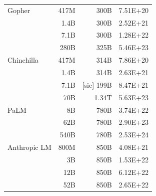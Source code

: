\begin{table}[!ht]
\begin{tabular}{lrrr}
         \midrule
         Gopher & 417M & 300B & 7.51E+20 \\
         & 1.4B & 300B & 2.52E+21 \\
         & 7.1B & 300B & 1.28E+22 \\
         & 280B	& 325B & 5.46E+23 \\
         \midrule
         Chinchilla & 417M & 314B & 7.86E+20 \\
         & 1.4B & 314B & 2.63E+21 \\
         & 7.1B & [sic] 199B & 8.47E+21 \\
         & 70B	& 1.34T & 5.63E+23 \\
         \midrule
        PaLM & 8B & 780B & 3.74E+22 \\
         & 62B & 780B & 2.90E+23 \\
         & 540B & 780B & 2.53E+24 \\
         \midrule
        Anthropic LM & 800M & 850B & 4.08E+21 \\
         & 3B & 850B & 1.53E+22 \\
         & 12B & 850B & 6.12E+22 \\
         & 52B & 850B & 2.65E+22 \\
    \bottomrule
    \end{tabular}
    \label{tab:appendix-flops}
\end{table}
\endgroup